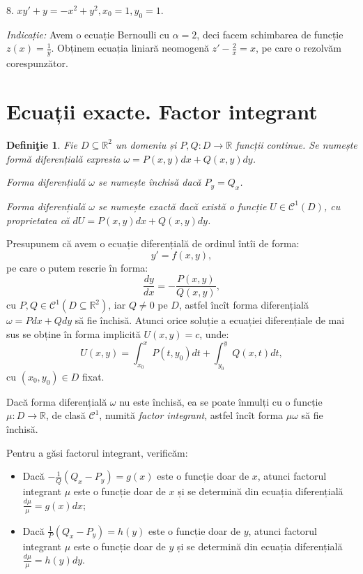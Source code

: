 \documentclass[11pt,a4paper]{article}
\newcommand\kal{\mathcal}
\newcommand\seq{\subseteq}
\newcommand\RR{\mathbb{R}}
\theoremstyle{dotless}
\theoremstyle{dotlessdr}
\newtheorem{definition}{Defini\c{t}ie}[section]
\begin{document}
\vspace{1cm}

8. $xy' + y = -x^2 + y^2, x_0 = 1, y_0 = 1$.

\emph{Indicație:} Avem o ecuație Bernoulli cu $\alpha = 2$, deci facem schimbarea
de funcție $z(x) = \frac{1}{y}$. Obținem ecuația liniară neomogenă $z' - \frac{2}{x} = x$,
pe care o rezolvăm corespunzător.




\section*{Ecuații exacte. Factor integrant}

\begin{definition}\label{def:f-dif}
  Fie $D \seq \RR^2$ un domeniu și $P, Q : D \to \RR$ funcții continue.
  Se numește \emph{formă diferențială} expresia $\omega = P(x, y) dx + Q(x, y)dy$.

  Forma diferențială $\omega$ se numește \emph{închisă} dacă $P_y = Q_x$.

  Forma diferențială $\omega$ se numește \emph{exactă} dacă există o funcție
  $U \in \kal{C}^1(D)$, cu proprietatea că $dU = P(x, y) dx + Q(x, y) dy$.
\end{definition}

Presupunem că avem o ecuație diferențială de ordinul întîi de forma:
\[
  y' = f(x, y),
\]
pe care o putem rescrie în forma:
\[
  \frac{dy}{dx} = -\frac{P(x, y)}{Q(x, y)},
\]
cu $P, Q \in \kal{C}^1(D \seq \RR^2)$, iar $Q \neq 0$ pe $D$, astfel încît
forma diferențială $\omega = Pdx + Qdy$ să fie închisă. Atunci orice soluție
a ecuației diferențiale de mai sus se obține în forma implicită $U(x, y) = c$,
unde:
\begin{equation}
  \label{eq:u-inchis}
  U(x, y) = \int_{x_0}^x P(t, y_0) dt + \int_{y_0}^y Q(x, t) dt,
\end{equation}
cu $(x_0, y_0) \in D$ fixat.

Dacă forma diferențială $\omega$ nu este închisă, ea se poate înmulți cu o funcție
$\mu : D \to \RR$, de clasă $\kal{C}^1$, numită \emph{factor integrant}, astfel încît
forma $\mu\omega$ să fie închisă.

Pentru a găsi factorul integrant, verificăm:
\begin{itemize}
\item Dacă $-\frac{1}{Q} (Q_x - P_y) = g(x)$ este o funcție doar de $x$, atunci
  factorul integrant $\mu$ este o funcție doar de $x$ și se determină din ecuația
  diferențială $\frac{d\mu}{\mu} = g(x) dx$;
\item Dacă $\frac{1}{P} (Q_x - P_y) = h(y)$ este o funcție doar de $y$, atunci factorul
  integrant $\mu$ este o funcție doar de $y$ și se determină din ecuația diferențială
  $\frac{d\mu}{\mu} = h(y) dy$.
\end{itemize}
\end{document}
